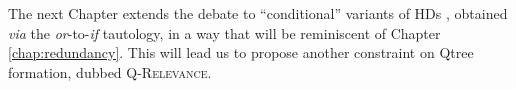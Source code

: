 The next Chapter extends the debate to ``conditional'' variants of HDs \parencite{Mandelkern2018,Kalomoiros2024}, obtained \textit{via} the \textit{or}-to-\textit{if} tautology, in a way that will be reminiscent of Chapter \ref{chap:redundancy}. This will lead us to propose another constraint on Qtree formation, dubbed \textsc{Q-Relevance}.






